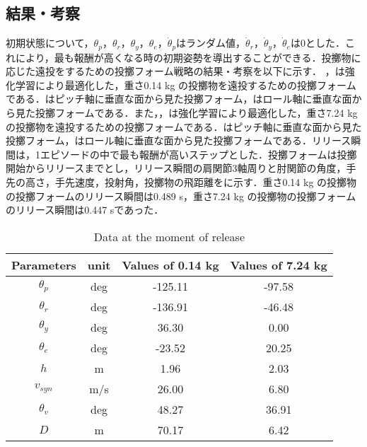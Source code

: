 \subsection{結果・考察}
初期状態について，$\theta_{p}$，$\theta_{r}$，$\theta_{y}$，$\theta_{e}$，$\dot{\theta}_{p}$はランダム値，$\dot{\theta}_{r}$，$\dot{\theta}_{y}$，$\dot{\theta}_{e}$は0とした．これにより，最も報酬が高くなる時の初期姿勢を導出することができる．投擲物に応じた遠投をするための投擲フォーム戦略の結果・考察を以下に示す．
，は強化学習により最適化した，重さ0.14 kg の投擲物を遠投するための投擲フォームである．はピッチ軸に垂直な面から見た投擲フォーム，はロール軸に垂直な面から見た投擲フォームである．また，，は強化学習により最適化した，重さ7.24 kg の投擲物を遠投するための投擲フォームである．はピッチ軸に垂直な面から見た投擲フォーム，はロール軸に垂直な面から見た投擲フォームである．リリース瞬間は，1エピソードの中で最も報酬が高いステップとした．投擲フォームは投擲開始からリリースまでとし，リリース瞬間の肩関節3軸周りと肘関節の角度，手先の高さ，手先速度，投射角，投擲物の飛距離をに示す．重さ0.14 kg の投擲物の投擲フォームのリリース瞬間は0.489 s，重さ7.24 kg の投擲物の投擲フォームのリリース瞬間は0.447 sであった．

\begin{table}[tb]
  \begin{center}
    \caption{Data at the moment of release}

    \begin{tabular}{c|c|c|c}
      \hline
      Parameters & unit & Values of 0.14 kg & Values of 7.24 kg \\
      \hline
      $\theta_{p}$ & deg & -125.11 & -97.58 \\
      $\theta_{r}$ & deg & -136.91 & -46.48 \\
      $\theta_{y}$ & deg  & 36.30 & 0.00 \\
      $\theta_{e}$ & deg & -23.52 & 20.25 \\
      $h$ & m & 1.96 & 2.03 \\
      $v_{syn}$ & m/s & 26.00 & 6.80 \\
      $\theta_{v}$ & deg & 48.27 & 36.91 \\
      $D$ & m & 70.17 & 6.42 \\
      \hline
    \end{tabular}
  \end{center}
\end{table}

